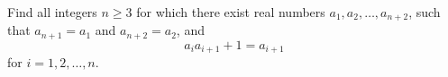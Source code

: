 Find all integers $n\geq3$ for which there exist real numbers $a_1,a_2,\ldots,a_{n+2}$, such that $a_{n+1}=a_1$ and $a_{n+2}=a_2$, and \[a_ia_{i+1}+1=a_{i+1}\] for $i=1,2,\ldots,n$.